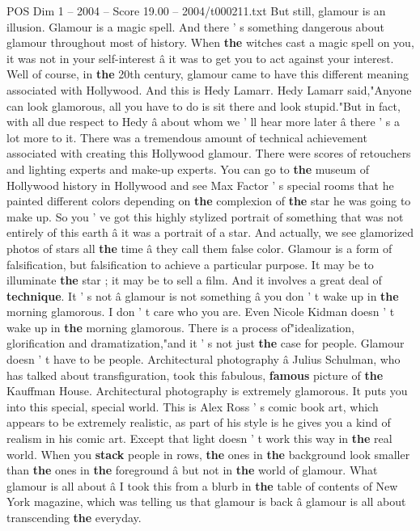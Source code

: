 \begin{textsample}{POS Dim 1 – 2004 – Score 19.00 – 2004/t000211.txt}
But still, glamour is an illusion.
Glamour is a magic spell.
And there ' s something dangerous about glamour throughout most of history.
When \textbf{the} witches cast a magic spell on you, it was not in your self-interest â it was to get you to act against your interest.
Well of course, in \textbf{the} 20th century, glamour came to have this different meaning associated with Hollywood.
And this is Hedy Lamarr.
Hedy Lamarr said,"Anyone can look glamorous, all you have to do is sit there and look stupid."But in fact, with all due respect to Hedy â about whom we ' ll hear more later â there ' s a lot more to it.
There was a tremendous amount of technical achievement associated with creating this Hollywood glamour.
There were scores of retouchers and lighting experts and make-up experts.
You can go to \textbf{the} museum of Hollywood history in Hollywood and see Max Factor ' s special rooms that he painted different colors depending on \textbf{the} complexion of \textbf{the} star he was going to make up.
So you ' ve got this highly stylized portrait of something that was not entirely of this earth â it was a portrait of a star.
And actually, we see glamorized photos of stars all \textbf{the} time â they call them false color.
Glamour is a form of falsification, but falsification to achieve a particular purpose.
It may be to illuminate \textbf{the} star ; it may be to sell a film.
And it involves a great deal of \textbf{technique}.
It ' s not â glamour is not something â you don ' t wake up in \textbf{the} morning glamorous.
I don ' t care who you are.
Even Nicole Kidman doesn ' t wake up in \textbf{the} morning glamorous.
There is a process of"idealization, glorification and dramatization,"and it ' s not just \textbf{the} case for people.
Glamour doesn ' t have to be people.
Architectural photography â Julius Schulman, who has talked about transfiguration, took this fabulous, \textbf{famous} picture of \textbf{the} Kauffman House.
Architectural photography is extremely glamorous.
It puts you into this special, special world.
This is Alex Ross ' s comic book art, which appears to be extremely realistic, as part of his style is he gives you a kind of realism in his comic art.
Except that light doesn ' t work this way in \textbf{the} real world.
When you \textbf{stack} people in rows, \textbf{the} ones in \textbf{the} background look smaller than \textbf{the} ones in \textbf{the} foreground â but not in \textbf{the} world of glamour.
What glamour is all about â I took this from a blurb in \textbf{the} table of contents of New York magazine, which was telling us that glamour is back â glamour is all about transcending \textbf{the} everyday.

\end{textsample}
